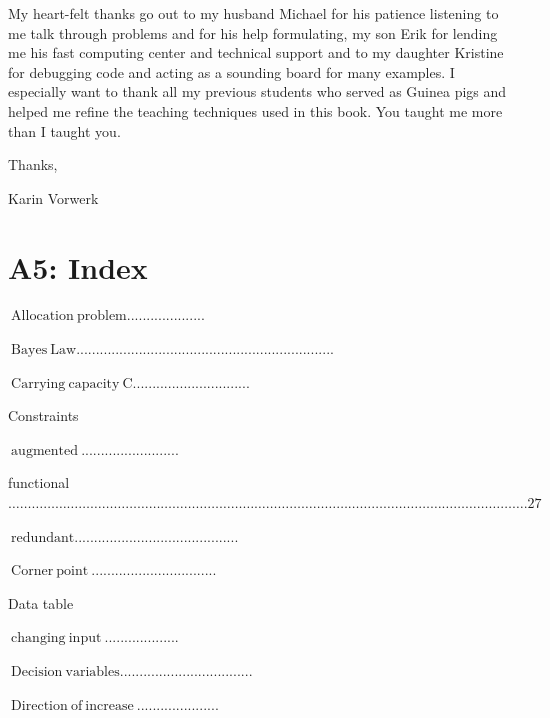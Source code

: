 \documentclass[10pt]{article}
\begin{document}
My heart-felt thanks go out to my husband Michael for his patience listening to me talk through problems and for his help formulating, my son Erik for lending me his fast computing center and technical support and to my daughter Kristine for debugging code and acting as a sounding board for many examples. I especially want to thank all my previous students who served as Guinea pigs and helped me refine the teaching techniques used in this book. You taught me more than I taught you.

Thanks,

Karin Vorwerk

\section{A5: Index}
$\mathrm{~ A l l o c a t i o n ~ p r o b l e m . . . . . . . . . . . . . . . . . . . .}$

$\mathrm{~ B a y e s ~ L a w . . . . . . . . . . . . . . . . . . . . . . . . . . . . . . . . . . . . . . . . . . . . . . . . . . . . . . . . . . . . . . . . . .}$

$\mathrm{~ C a r r y i n g ~ c a p a c i t y ~ C . . . . . . . . . . . . . . . . . . . . . . . . . . . . . .}$

Constraints

$\mathrm{~ a u g m e n t e d ~ . . . . . . . . . . . . . . . . . . . . . . . . .}$

functional $\ldots \ldots \ldots \ldots \ldots \ldots \ldots \ldots \ldots \ldots \ldots \ldots \ldots \ldots \ldots \ldots \ldots \ldots \ldots \ldots \ldots \ldots \ldots \ldots \ldots \ldots \ldots \ldots \ldots \ldots \ldots \ldots \ldots \ldots \ldots \ldots \ldots \ldots \ldots \ldots \ldots \ldots \ldots \ldots .27$

$\mathrm{~ r e d u n d a n t . . . . . . . . . . . . . . . . . . . . . . . . . . . . . . . . . . . . . . . . . .}$

$\mathrm{~ C o r n e r ~ p o i n t ~ . . . . . . . . . . . . . . . . . . . . . . . . . . . . . . . .}$

Data table

$\mathrm{~ c h a n g i n g ~ i n p u t ~ . . . . . . . . . . . . . . . . . . .}$

$\mathrm{~ D e c i s i o n ~ v a r i a b l e s . . . . . . . . . . . . . . . . . . . . . . . . . . . . . . . . . .}$

$\mathrm{~ D i r e c t i o n ~ o f ~ i n c r e a s e ~ . . . . . . . . . . . . . . . . . . . . .}$
\end{document}
